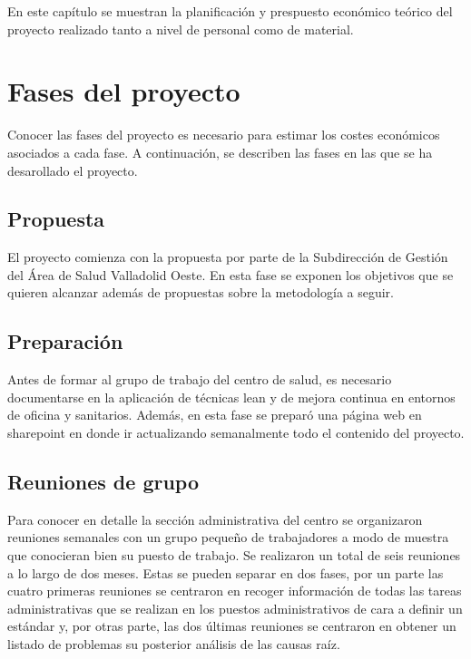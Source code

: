 En este capítulo se muestran la planificación y prespuesto económico teórico del proyecto realizado tanto a nivel de personal como de material.

\section{Fases del proyecto}

Conocer las fases del proyecto es necesario para estimar los costes económicos asociados a cada fase.
A continuación, se describen las fases en las que se ha desarollado el proyecto.

\subsection{Propuesta}

El proyecto comienza con la propuesta por parte de la Subdirección de Gestión del Área de Salud Valladolid Oeste. En esta fase se exponen los objetivos que se quieren alcanzar además de propuestas sobre la metodología a seguir.

\subsection{Preparación}

Antes de formar al grupo de trabajo del centro de salud, es necesario documentarse en la aplicación de técnicas lean y de mejora continua en entornos de oficina y sanitarios. Además, en esta fase se preparó una página web en \Gls{sharepoint} en donde ir actualizando semanalmente todo el contenido del proyecto.

\subsection{Reuniones de grupo}

Para conocer en detalle la sección administrativa del centro se organizaron reuniones semanales con un grupo pequeño de trabajadores a modo de muestra que conocieran bien su puesto de trabajo.
Se realizaron un total de seis reuniones a lo largo de dos meses.
Estas se pueden separar en dos fases, por un parte las cuatro primeras reuniones se centraron en recoger información de todas las tareas administrativas que se realizan en los puestos administrativos de cara a definir un estándar y, por otras parte, las dos últimas reuniones se centraron en obtener un listado de problemas su posterior análisis de las causas raíz.

